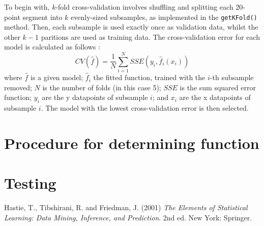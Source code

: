 \documentclass[onecolumn, 12pt, a4paper]{article}
\begin{document}
To begin with, $k$-fold cross-validation involves shuffling and 
splitting each 20-point segment into $k$ evenly-sized subsamples,
as implemented in the \texttt{getKFold()} method.
Then, each subsample is used exactly once as validation data,
whilst the other $k - 1$ paritions are used as training data.
The cross-validation error for each model is calculated
as follows \cite{EOSL}:
\[
    CV({\hat{f}}) = \frac{1}{N}\sum_{i = 1}^{N}SSE(y_{i}, \hat{f}_{i}(x_{i}))
\]
where
$\hat{f}$ is a given model;
$\hat{f}_{i}$ the fitted function, trained with the $i$-th subsample removed;
$N$ is the number of folds (in this case 5);
$SSE$ is the sum squared error function;
$y_{i}$ are the y datapoints of subsample $i$;
and $x_{i}$ are the x datapoints of subsample $i$.
The model with the lowest cross-validation error is then selected.

\section{Procedure for determining function}

\section{Testing}

\begin{thebibliography}{9}
    Hastie, T., Tibshirani, R. and Friedman, J. (2001)
    \textit{The Elements of Statistical Learning: Data Mining, Inference, and Prediction}. 
    2nd ed. New York: Springer.
\end{thebibliography}
    
\end{document}
